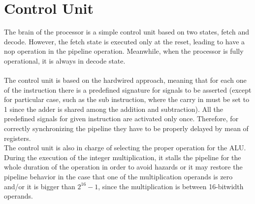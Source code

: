 \section{Control Unit}
The brain of the processor is a simple control unit based on two states, fetch and decode. However, the fetch state is executed only at the reset, leading to have a nop operation in the pipeline operation. Meanwhile, when the processor is fully operational, it is always in decode state.\\\\
The control unit is based on the hardwired approach, meaning that for each one of the instruction there is a predefined signature for signals to be asserted (except for particular case, such as the sub instruction, where the carry in must be set to 1 since the adder is shared among the addition and subtraction). All the predefined signals for given instruction are activated only once. Therefore, for correctly synchronizing the pipeline they have to be properly delayed by mean of registers.\\
The control unit is also in charge of selecting the proper operation for the ALU. During the execution of the integer multiplication, it stalls the pipeline for the whole duration of the operation in order to avoid hazards or it may restore the pipeline behavior in the case that one of the multiplication operands is zero and/or it is bigger than $2^{16}-1$, since the multiplication is between 16-bitwidth operands.

